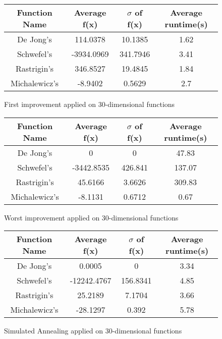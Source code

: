 \documentclass{article}
\begin{document}
\begin{figure}[H]
\begin{tabular}{|c||c|c|c|} \hline
	Function Name & Average f(x) & $\sigma$ of f(x) & Average runtime(s) \\ \hline \hline
	De Jong's & 114.0378 & 10.1385 & 1.62 \\ \hline
	Schwefel's & -3934.0969 & 341.7946 & 3.41 \\ \hline
	Rastrigin's & 346.8527 & 19.4845 & 1.84 \\ \hline
	Michalewicz's & -8.9402 & 0.5629 & 2.7 \\ \hline
\end{tabular}
\caption{First improvement applied on 30-dimensional functions}
\end{figure}

\begin{figure}[H]
\begin{tabular}{|c||c|c|c|} \hline
	Function Name & Average f(x) & $\sigma$ of f(x) & Average runtime(s) \\ \hline \hline
	De Jong's & 0 & 0 & 47.83 \\ \hline
	Schwefel's & -3442.8535 & 426.841 & 137.07 \\ \hline
	Rastrigin's & 45.6166 & 3.6626 & 309.83 \\ \hline
	Michalewicz's & -8.1131 & 0.6712 & 0.67 \\ \hline
\end{tabular}
\caption{Worst improvement applied on 30-dimensional functions}
\end{figure}

\begin{figure}[H]
\begin{tabular}{|c||c|c|c|} \hline
	Function Name & Average f(x) & $\sigma$ of f(x) & Average runtime(s) \\ \hline \hline
	De Jong's & 0.0005 & 0 & 3.34 \\ \hline
	Schwefel's & -12242.4767 & 156.8341 & 4.85 \\ \hline
	Rastrigin's & 25.2189 & 7.1704 & 3.66 \\ \hline
	Michalewicz's & -28.1297 & 0.392 & 5.78 \\ \hline
\end{tabular}
\caption{Simulated Annealing applied on 30-dimensional functions}
\end{figure}
\end{document}
